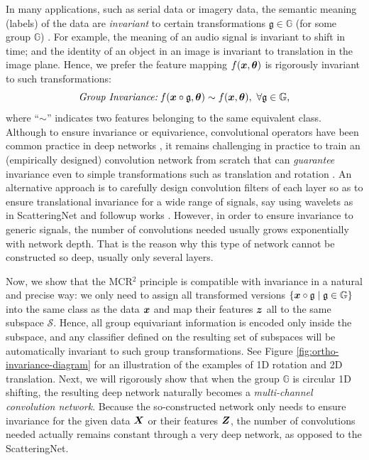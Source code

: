 \documentclass[../../book-main.tex]{subfiles}
\begin{document}
In many applications, such as serial data or imagery data, the semantic meaning (labels) of the data are  {\em invariant} to certain transformations $\mathfrak{g} \in \mathbb{G}$ (for some group $\mathbb{G}$) \cite{CohenW16,deep-sets-NIPS2017}. For example, the meaning of an audio signal is invariant to shift in time; and the identity of an object in an image is invariant to translation in the image plane. Hence, we prefer the feature mapping $f(\bm{x},\bm \theta)$ is rigorously invariant to such transformations:
\begin{equation}
\mbox{\em Group Invariance:}\;   f(\bm{x}\circ \mathfrak{g}, \bm \theta) \sim f(\bm{x},\bm \theta),\ \forall \mathfrak{g} \in \mathbb{G},
\end{equation}
where ``$\sim$'' indicates two features belonging to the same equivalent class. Although to ensure invariance or equivarience, convolutional operators have been common practice in deep networks \cite{CohenW16}, it remains challenging in practice to train an (empirically designed) convolution network from scratch that can {\em guarantee} invariance even to simple transformations such as translation and rotation \cite{azulay2018deep,engstrom2017rotation}. An alternative approach is to carefully design convolution filters of each layer so as to ensure translational invariance for a wide range of signals, say using wavelets as in ScatteringNet \cite{scattering-net} and followup works \cite{Wiatowski-2018}. However, in order to ensure invariance to generic signals, the number of convolutions needed usually grows exponentially with network depth. That is the reason why this type of network cannot be constructed so deep, usually only several layers. 

Now, we show that the MCR$^2$ principle is compatible with invariance in a natural and precise way: we only need to assign all transformed versions $\{\bm{x}\circ \mathfrak{g} \mid \mathfrak{g} \in \mathbb G\}$  into the same class as the data $\bm{x}$ and map their features $\bm{z}$ all to the same subspace $\mathcal S$. Hence, all group equivariant information is encoded only inside the subspace, and any classifier defined on the resulting set of subspaces will be automatically invariant to such group transformations. See Figure \ref{fig:ortho-invariance-diagram} for an illustration of the examples of 1D rotation and 2D translation.  Next, we will rigorously show that when the group $\mathbb G$ is circular 1D shifting, the resulting deep network naturally becomes a {\em multi-channel convolution network}. 
Because the so-constructed network only needs to ensure invariance for the given data $\bm{X}$ or their features $\bm{Z}$, the number of convolutions needed actually remains constant through a very deep network, as opposed to the ScatteringNet. 
\end{document}
